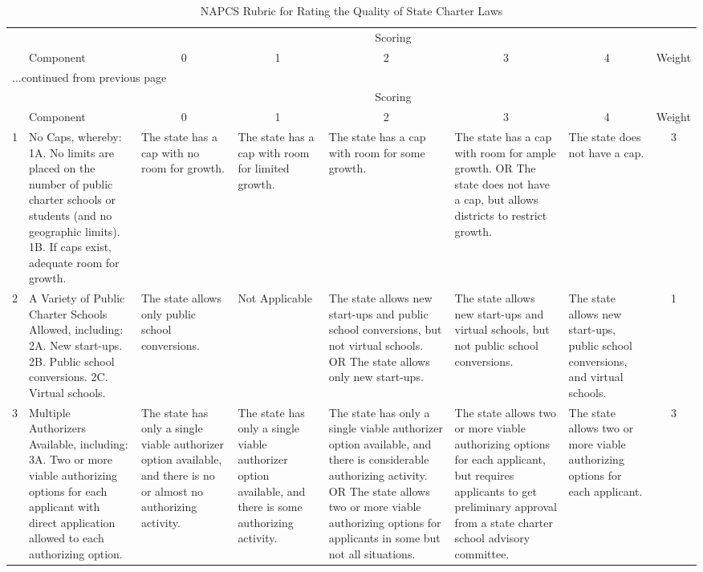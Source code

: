 {\smaller
\begin{longtable}{rp{2.2in}p{0.9in}p{0.9in}p{0.9in}p{0.9in}p{0.9in}c}
\caption{NAPCS Rubric for Rating the Quality of State Charter Laws} \\ 
   \hline & & \multicolumn{5}{c}{Scoring} & \\ \cline{3-7}& Component & \multicolumn{1}{c}{0} & \multicolumn{1}{c}{1} & \multicolumn{1}{c}{2} & \multicolumn{1}{c}{3} & \multicolumn{1}{c}{4} & Weight \\ \hline\endfirsthead \multicolumn{8}{l}{{...continued from previous page}}\\ \hline & & \multicolumn{5}{c}{Scoring} & \\ \cline{3-7}& Component & \multicolumn{1}{c}{0} & \multicolumn{1}{c}{1} & \multicolumn{1}{c}{2} & \multicolumn{1}{c}{3} & \multicolumn{1}{c}{4} & Weight \\ \hline \endhead   1 & No Caps, whereby: 1A. No limits are placed on the number of public charter schools or students (and no geographic limits). 1B. If caps exist, adequate room for growth.  & The state has a cap with no room for growth.  & The state has a cap with room for limited growth.  & The state has a cap with room for some growth.  & The state has a cap with room for ample growth. OR The state does not have a cap, but allows districts to restrict growth.  & The state does not have a cap. &   3 \\ 
   \hline
  2 & A Variety of Public Charter Schools Allowed, including: 2A. New start-ups. 2B. Public school conversions. 2C. Virtual schools.  & The state allows only public school conversions.  & Not Applicable  & The state allows new start-ups and public school conversions, but not virtual schools. OR The state allows only new start-ups.  & The state allows new start-ups and virtual schools, but not public school conversions.  & The state allows new start-ups, public school conversions, and virtual schools.  &   1 \\ 
   \hline
  3 & Multiple Authorizers Available, including: 3A. Two or more viable authorizing options for each applicant with direct application allowed to each authorizing option.  & The state has only a single viable authorizer option available, and there is no or almost no authorizing activity.  & The state has only a single viable authorizer option available, and there is some authorizing activity.  & The state has only a single viable authorizer option available, and there is considerable authorizing activity. OR The state allows two or more viable authorizing options for applicants in some but not all situations.  & The state allows two or more viable authorizing options for each applicant, but requires applicants to get preliminary approval from a state charter school advisory committee.  & The state allows two or more viable authorizing options for each applicant.  &   3 \\ 

\end{longtable}}
